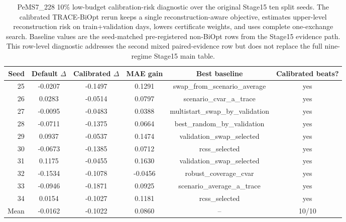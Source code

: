 \begin{table}[pos=htbp]
\centering
\caption{PeMS7\_228 10\% low-budget calibration-risk diagnostic over the original Stage15 ten split seeds. The calibrated TRACE-BiOpt rerun keeps a single reconstruction-aware objective, estimates upper-level reconstruction risk on train+validation days, lowers certificate weights, and uses complete one-exchange search. Baseline values are the seed-matched pre-registered non-BiOpt rows from the Stage15 evidence path. This row-level diagnostic addresses the second mixed paired-evidence row but does not replace the full nine-regime Stage15 main table.}
\label{tab:trace-biopt-calibration-probe}
\small
\begin{tabular}{rccccc}
\toprule
Seed & Default $\Delta$ & Calibrated $\Delta$ & MAE gain & Best baseline & Calibrated beats? \\
\midrule
25 & -0.0207 & -0.1497 & 0.1291 & swap\_from\_scenario\_average & yes \\
26 & 0.0283 & -0.0514 & 0.0797 & scenario\_cvar\_a\_trace & yes \\
27 & -0.0095 & -0.0483 & 0.0388 & multistart\_swap\_by\_validation & yes \\
28 & -0.0711 & -0.1375 & 0.0664 & best\_random\_by\_validation & yes \\
29 & 0.0937 & -0.0537 & 0.1474 & validation\_swap\_selected & yes \\
30 & -0.0673 & -0.1385 & 0.0712 & rcss\_selected & yes \\
31 & 0.1175 & -0.0455 & 0.1630 & validation\_swap\_selected & yes \\
32 & -0.1534 & -0.1078 & -0.0456 & robust\_coverage\_cvar & yes \\
33 & -0.0946 & -0.1871 & 0.0925 & scenario\_average\_a\_trace & yes \\
34 & 0.0154 & -0.1027 & 0.1181 & rcss\_selected & yes \\
\midrule
Mean & -0.0162 & -0.1022 & 0.0860 & -- & 10/10 \\
\bottomrule
\end{tabular}
\par\vspace{4pt}{\raggedright\footnotesize Calibrated-risk paired t-test versus zero delta: $p=6.4e-05$; Wilcoxon signed-rank $p=0.0010$; mean MAE-gain t-test $p=7.4e-04$. Negative $\Delta$ means TRACE-BiOpt has lower held-out GLS/MAP MAE than the seed-matched best pre-registered non-BiOpt baseline.\par}
\end{table}
